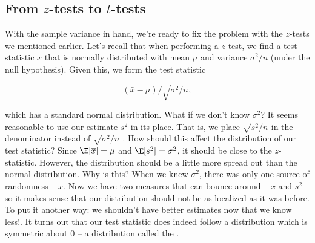 

\subsection{From $z$-tests to $t$-tests}



With the sample variance in hand, we're ready to fix the problem with the $z$-tests we mentioned earlier. Let's recall that when performing a $z$-test, we find a test statistic $\bar{x}$ that is normally distributed with mean $\mu$ and variance $\sigma^{2}/n$ (under the null hypothesis). Given this, we form the test statistic

\begin{equation*}

\left(\bar{x}-\mu\right)/\sqrt{\sigma^{2}/n},

\end{equation*}

which has a standard normal distribution. What if we don't know $\sigma^{2}$? It seems reasonable to use our estimate $s^{2}$ in its place. That is, we place $\sqrt{s^{2}/n}$ in the denominator instead of $\sqrt{\sigma^{2}/n}$ . How should this affect the distribution of our test statistic? Since $\E[\overline{x}]=\mu$ and $\E[s^{2}]=\sigma^{2}$, it should be close to the $z$-statistic. However, the distribution should be a little more spread out than the normal distribution. Why is this? When we knew $\sigma^{2}$, there was only one source of randomness -- $\bar{x}$. Now we have two measures that can bounce around -- $\bar{x}$ and $s^{2}$ -- so it makes sense that our distribution should not be as localized as it was before. To put it another way: we shouldn't have better estimates now that we know less!. It turns out that our test statistic does indeed follow a distribution which is symmetric about 0 -- a distribution called the .






